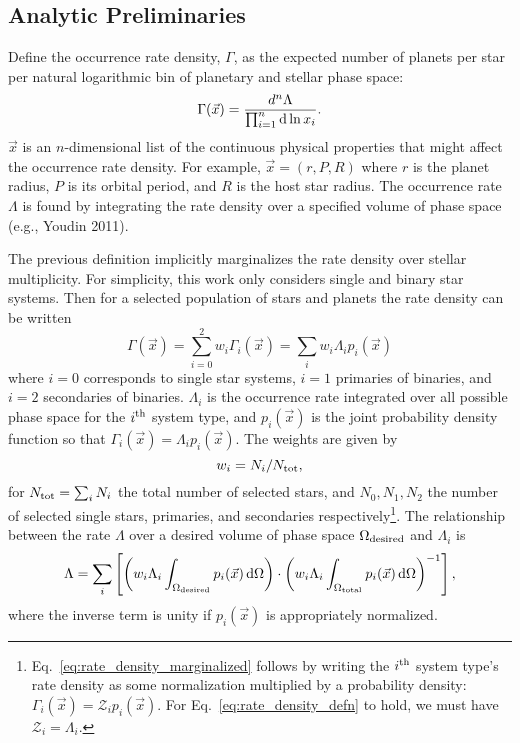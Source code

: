 \subsection{Analytic Preliminaries}
\label{sec:analytic_preliminaries}

Define the occurrence rate density, $\Gamma$,
as the expected number of planets per star per natural logarithmic bin 
of planetary and stellar phase space:
\begin{equation}
\Gamma(\vec{x}) = \frac{d^n\Lambda}{\prod_{i=1}^{n} {\rm d} \ln x_i  }.
\label{eq:rate_density_defn}
\end{equation}
$\vec{x}$ is an $n$-dimensional list of the continuous physical properties 
that might affect the occurrence rate density. 
For example,
$\vec{x}=(r,P,R)$ where $r$ is the planet radius, $P$ is its orbital period, 
and $R$ is the host star radius.
The occurrence rate $\Lambda$ is found by integrating the rate density over a 
specified volume of phase space (e.g., Youdin 2011).


The previous definition implicitly marginalizes the rate density over stellar 
multiplicity.
For simplicity, this work only considers single and binary star systems.
Then for a selected population of stars and planets the rate density can be 
written
\begin{equation}
\Gamma(\vec{x})
= \sum_{i=0}^{2} w_i \Gamma_i(\vec{x})
= \sum_i w_i \Lambda_i p_i(\vec{x})
\label{eq:rate_density_marginalized}
\end{equation}
where $i=0$ corresponds to single star systems, $i=1$ primaries of binaries, 
and $i=2$ secondaries of binaries.
$\Lambda_i$ is the occurrence rate integrated over all possible phase space  
for the $i^{\rm th}$ system type, and $p_i(\vec{x})$ is the joint 
probability density function so that $\Gamma_i(\vec{x}) = \Lambda_i 
p_i(\vec{x})$.
The weights are given by 
\begin{equation}
w_i = N_i/N_{\rm tot},
\end{equation}
for $N_{\rm tot} = \sum_i N_i$ the total number of selected stars, and 
$N_0,N_1,N_2$ the number of selected single stars, primaries, and 
secondaries respectively\footnote{
Eq.~\ref{eq:rate_density_marginalized} follows by writing the $i^{\rm 
th}$ system type's rate density as some normalization multiplied by a 
probability density:
$\Gamma_i(\vec{x}) = \mathcal{Z}_i p_i(\vec{x})$.
For Eq.~\ref{eq:rate_density_defn} to hold, we must have $\mathcal{Z}_i = 
\Lambda_i$.
}.
The relationship between the rate $\Lambda$ over a desired volume of 
phase space $\Omega_{\rm desired}$ and $\Lambda_i$ is
\begin{equation}
\Lambda = \sum_i
\left[
\left(
w_i \Lambda_i \int_{\Omega_{\rm desired}} p_i(\vec{x}) \,{\rm d}\Omega
\right)
\cdot
\left(
w_i \Lambda_i \int_{\Omega_{\rm total}} p_i(\vec{x}) \,{\rm d}\Omega
\right)^{-1}
\right],
\label{eq:occ_rate}
\end{equation}
where the inverse term is unity if $p_i(\vec{x})$ is appropriately normalized.

